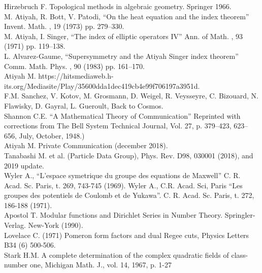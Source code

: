 \documentclass[preprint,12pt]{elsarticle}
\begin{document}
  
\begin{thebibliography}{99}
 Hirzebruch F. Topological methods in algebraic geometry. Springer 1966.\\
 M. Atiyah, R. Bott, V. Patodi, ``On the heat equation and the index theorem'' Invent. Math. , 19 (1973) pp. 279--330.\\
 M. Atiyah, I. Singer, ``The index of elliptic operators IV'' Ann. of Math. , 93 (1971) pp. 119--138. \\
 L. Alvarez-Gaume, ``Supersymmetry and the Atiyah Singer index theorem'' Comm. Math. Phys. , 90 (1983) pp. 161--170.\\
 Atiyah M. https://hitsmediaweb.h-its.org/Mediasite/Play/35600dda1dec419cb4e99f706197a3951d. \\ 
 F.M. Sanchez, V. Kotov, M. Grosmann, D. Weigel, R. Veysseyre, C. Bizouard, N. Flawisky, D. Gayral, L. Gueroult, Back to Cosmos.\\
 Shannon C.E. ``A Mathematical Theory of Communication'' Reprinted with corrections from The Bell System Technical Journal, Vol. 27, p. 379–423, 623–656, July, October, 1948.)\\
 Atiyah M. Private Communication (december 2018).\\
 Tanabashi M. et al. (Particle Data Group), Phys. Rev. D98, 030001 (2018), and 2019 update.\\
 Wyler A., ``L'espace symetrique du groupe des equations de Maxwell'' C. R. Acad. Sc. Paris, t. 269, 743-745 (1969). Wyler A., C.R. Acad. Sci, Paris ``Les groupes des potentiels de Coulomb et de Yukawa''. C. R. Acad. Sc. Paris, t. 272, 186-188 (1971).\\
 Apostol T. Modular functions and Dirichlet Series in Number Theory. Springler-Verlag. New-York (1990).\\
 Lovelace C. (1971) Pomeron form factors and dual Regee cuts, Physics Letters B34 (6) 500-506.\\
 Stark H.M. A complete determination of the complex quadratic fields of class-number one, Michigan Math. J., vol. 14,‎ 1967, p. 1-27  \\

\end{thebibliography}
\end{document}
